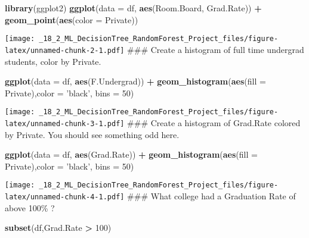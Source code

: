 \documentclass[]{article}
\newenvironment{Shaded}{\begin{snugshade}}{\end{snugshade}}
\newcommand{\DataTypeTok}[1]{\textcolor[rgb]{0.13,0.29,0.53}{#1}}
\newcommand{\DecValTok}[1]{\textcolor[rgb]{0.00,0.00,0.81}{#1}}
\newcommand{\KeywordTok}[1]{\textcolor[rgb]{0.13,0.29,0.53}{\textbf{#1}}}
\newcommand{\NormalTok}[1]{#1}
\newcommand{\OperatorTok}[1]{\textcolor[rgb]{0.81,0.36,0.00}{\textbf{#1}}}
\newcommand{\StringTok}[1]{\textcolor[rgb]{0.31,0.60,0.02}{#1}}
\begin{document}
\begin{Shaded}
\begin{Highlighting}[]
\KeywordTok{library}\NormalTok{(ggplot2)}
\KeywordTok{ggplot}\NormalTok{(}\DataTypeTok{data =}\NormalTok{ df, }\KeywordTok{aes}\NormalTok{(Room.Board, Grad.Rate)) }\OperatorTok{+}\StringTok{ }\KeywordTok{geom_point}\NormalTok{(}\KeywordTok{aes}\NormalTok{(}\DataTypeTok{color =}\NormalTok{ Private))}
\end{Highlighting}
\end{Shaded}

\texttt{[image: \_18\_2\_ML\_DecisionTree\_RandomForest\_Project\_files/figure-latex/unnamed-chunk-2-1.pdf]}
\#\#\# Create a histogram of full time undergrad students, color by
Private.

\begin{Shaded}
\begin{Highlighting}[]
\KeywordTok{ggplot}\NormalTok{(}\DataTypeTok{data =}\NormalTok{ df, }\KeywordTok{aes}\NormalTok{(F.Undergrad)) }\OperatorTok{+}\StringTok{ }\KeywordTok{geom_histogram}\NormalTok{(}\KeywordTok{aes}\NormalTok{(}\DataTypeTok{fill =}\NormalTok{ Private),}\DataTypeTok{color =} \StringTok{'black'}\NormalTok{, }\DataTypeTok{bins =} \DecValTok{50}\NormalTok{)}
\end{Highlighting}
\end{Shaded}

\texttt{[image: \_18\_2\_ML\_DecisionTree\_RandomForest\_Project\_files/figure-latex/unnamed-chunk-3-1.pdf]}
\#\#\# Create a histogram of Grad.Rate colored by Private. You should
see something odd here.

\begin{Shaded}
\begin{Highlighting}[]
\KeywordTok{ggplot}\NormalTok{(}\DataTypeTok{data =}\NormalTok{ df, }\KeywordTok{aes}\NormalTok{(Grad.Rate)) }\OperatorTok{+}\StringTok{ }\KeywordTok{geom_histogram}\NormalTok{(}\KeywordTok{aes}\NormalTok{(}\DataTypeTok{fill =}\NormalTok{ Private),}\DataTypeTok{color =} \StringTok{'black'}\NormalTok{, }\DataTypeTok{bins =} \DecValTok{50}\NormalTok{)}
\end{Highlighting}
\end{Shaded}

\texttt{[image: \_18\_2\_ML\_DecisionTree\_RandomForest\_Project\_files/figure-latex/unnamed-chunk-4-1.pdf]}
\#\#\# What college had a Graduation Rate of above 100\% ?

\begin{Shaded}
\begin{Highlighting}[]
\KeywordTok{subset}\NormalTok{(df,Grad.Rate }\OperatorTok{>}\StringTok{ }\DecValTok{100}\NormalTok{)}
\end{Highlighting}
\end{Shaded}
\end{document}
